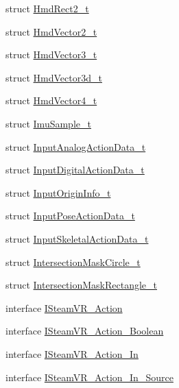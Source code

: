 \begin{DoxyCompactItemize}
\item 
struct \mbox{\hyperlink{struct_valve_1_1_v_r_1_1_hmd_rect2__t}{Hmd\+Rect2\+\_\+t}}
\item 
struct \mbox{\hyperlink{struct_valve_1_1_v_r_1_1_hmd_vector2__t}{Hmd\+Vector2\+\_\+t}}
\item 
struct \mbox{\hyperlink{struct_valve_1_1_v_r_1_1_hmd_vector3__t}{Hmd\+Vector3\+\_\+t}}
\item 
struct \mbox{\hyperlink{struct_valve_1_1_v_r_1_1_hmd_vector3d__t}{Hmd\+Vector3d\+\_\+t}}
\item 
struct \mbox{\hyperlink{struct_valve_1_1_v_r_1_1_hmd_vector4__t}{Hmd\+Vector4\+\_\+t}}
\item 
struct \mbox{\hyperlink{struct_valve_1_1_v_r_1_1_imu_sample__t}{Imu\+Sample\+\_\+t}}
\item 
struct \mbox{\hyperlink{struct_valve_1_1_v_r_1_1_input_analog_action_data__t}{Input\+Analog\+Action\+Data\+\_\+t}}
\item 
struct \mbox{\hyperlink{struct_valve_1_1_v_r_1_1_input_digital_action_data__t}{Input\+Digital\+Action\+Data\+\_\+t}}
\item 
struct \mbox{\hyperlink{struct_valve_1_1_v_r_1_1_input_origin_info__t}{Input\+Origin\+Info\+\_\+t}}
\item 
struct \mbox{\hyperlink{struct_valve_1_1_v_r_1_1_input_pose_action_data__t}{Input\+Pose\+Action\+Data\+\_\+t}}
\item 
struct \mbox{\hyperlink{struct_valve_1_1_v_r_1_1_input_skeletal_action_data__t}{Input\+Skeletal\+Action\+Data\+\_\+t}}
\item 
struct \mbox{\hyperlink{struct_valve_1_1_v_r_1_1_intersection_mask_circle__t}{Intersection\+Mask\+Circle\+\_\+t}}
\item 
struct \mbox{\hyperlink{struct_valve_1_1_v_r_1_1_intersection_mask_rectangle__t}{Intersection\+Mask\+Rectangle\+\_\+t}}
\item 
interface \mbox{\hyperlink{interface_valve_1_1_v_r_1_1_i_steam_v_r___action}{I\+Steam\+V\+R\+\_\+\+Action}}
\item 
interface \mbox{\hyperlink{interface_valve_1_1_v_r_1_1_i_steam_v_r___action___boolean}{I\+Steam\+V\+R\+\_\+\+Action\+\_\+\+Boolean}}
\item 
interface \mbox{\hyperlink{interface_valve_1_1_v_r_1_1_i_steam_v_r___action___in}{I\+Steam\+V\+R\+\_\+\+Action\+\_\+\+In}}
\item 
interface \mbox{\hyperlink{interface_valve_1_1_v_r_1_1_i_steam_v_r___action___in___source}{I\+Steam\+V\+R\+\_\+\+Action\+\_\+\+In\+\_\+\+Source}}

\end{DoxyCompactItemize}
